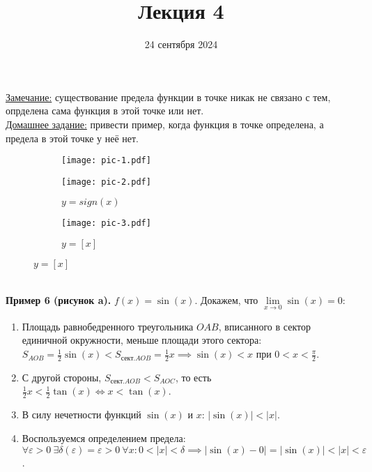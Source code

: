 \documentclass{article}
\title{Лекция 4}
\author{}
\date{24 сентября 2024}
\begin{document}
    \maketitle
    \noindent
    \underline{Замечание:} существование предела функции в точке никак не связано с тем, опрделена сама функция в этой точке или нет.\\
    \underline{Домашнее задание:} привести пример, когда функция в точке определена, а предела в этой точке у неё нет.    
    \begin{figure}[h]
        \begin{subfigure}[t]{0.3\textwidth}
            \texttt{[image: pic-1.pdf]}
            \caption{}
        \end{subfigure}
        \hfill
        \begin{subfigure}[t]{0.3\textwidth}
            \texttt{[image: pic-2.pdf]}
            \caption{\(y = sign(x)\)}
        \end{subfigure}
        \hfill
        \begin{subfigure}[t]{0.3\textwidth}
            \texttt{[image: pic-3.pdf]}
            \caption{\(y = [x]\)}
        \end{subfigure}
    \end{figure}\\
    \textbf{Пример 6 (рисунок a).} \(f(x) = \sin(x)\). Докажем, что \(\displaystyle \lim\limits_{x \to 0}\sin(x) = 0\):
    \begin{enumerate}
        \item Площадь равнобедренного треугольника \(OAB\), вписанного в сектор единичной окружности, меньше площади этого сектора: 
        \(\displaystyle S_{AOB} = \frac{1}{2}\sin(x) < S_{\text{сект.} AOB} = \frac{1}{2}x \implies \sin(x) < x\) при \(\displaystyle 0 < x < \frac{\pi}{2}\).
        \item С другой стороны, \(\displaystyle S_{\text{сект.} AOB} < S_{AOC}\), то есть \(\displaystyle \frac{1}{2}x < \frac{1}{2} \tan(x) \iff x < \tan(x)\).
        \item В силу нечетности функций \(\sin(x)\) и \(x\): \(|\sin(x)| < |x|\).
        \item Воспользуемся определением предела: \(\displaystyle \forall \varepsilon > 0\ \exists \delta(\varepsilon) = \varepsilon > 0\ \forall x: 0 < |x| < \delta \implies |\sin(x) - 0| = |\sin(x)| < |x| < \varepsilon\).
    \end{enumerate}       
\end{document}
